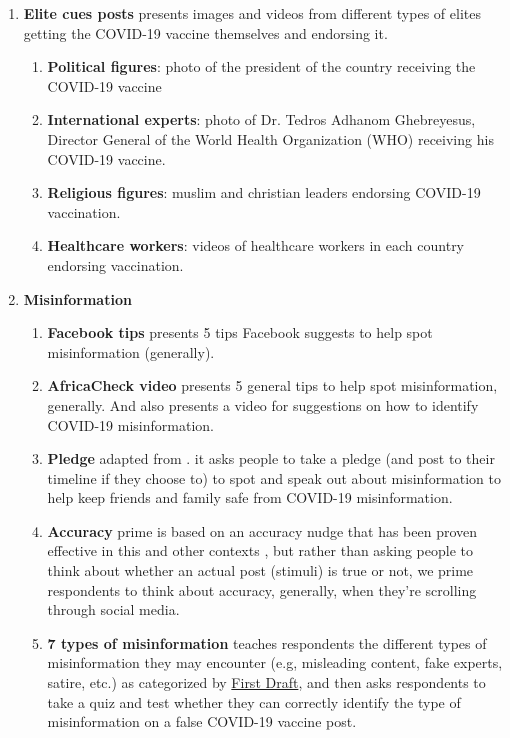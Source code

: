 \documentclass[letterpaper, 12pt, parskip=full,DIV=10]{scrartcl}
\begin{document}
\begin{enumerate}
  \item \textbf{Elite cues posts} presents images and videos from different types of elites getting the COVID-19 vaccine themselves and endorsing it. 
  \begin{enumerate}[noitemsep, topsep=0pt]
    \item \textbf{Political figures}: photo of the president of the country receiving the COVID-19 vaccine
    \item \textbf{International experts}: photo of Dr. Tedros Adhanom Ghebreyesus, Director General of the World Health Organization (WHO) receiving his COVID-19 vaccine.
    \item \textbf{Religious figures}: muslim and christian leaders endorsing COVID-19 vaccination.
    \item \textbf{Healthcare workers}: videos of healthcare workers in each country endorsing vaccination.
  \end{enumerate}
  \item \textbf{Misinformation}
    \begin{enumerate}[noitemsep, topsep=0pt]
    \item \textbf{Facebook tips} presents 5 tips Facebook suggests to help spot misinformation (generally).
    \item \textbf{AfricaCheck video} presents 5 general tips to help spot misinformation, generally. And also presents a video for suggestions on how to identify COVID-19 misinformation.
    \item \textbf{Pledge} adapted from \cite{offer-westort2021optimal}. it asks people to take a pledge (and post to their timeline if they choose to) to spot and speak out about misinformation to help keep friends and family safe from COVID-19 misinformation.
    \item \textbf{Accuracy} prime is based on an accuracy nudge that has been proven effective in this and other contexts \citep{pennycook2020fighting, offer-westort2021optimal}, but rather than asking people to think about whether an actual post (stimuli) is true or not, we prime respondents to think about accuracy, generally, when they're scrolling through social media.
    \item \textbf{7 types of misinformation} teaches respondents the different types of misinformation they may encounter (e.g, misleading content, fake experts, satire, etc.) as categorized by \href{https://firstdraftnews.org/}{First Draft}, and then asks respondents to take a quiz and test whether they can correctly identify the type of misinformation on a false COVID-19 vaccine post. 

\end{enumerate}
\end{enumerate}
\end{document}
